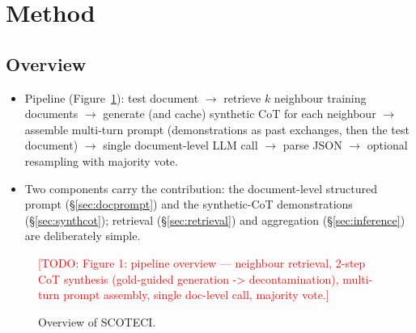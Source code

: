 \documentclass[11pt]{article}
\newcommand{\todo}[1]{\textcolor{red}{[TODO: #1]}}
\newcommand{\method}{SCOTECI}
\begin{document}
\section{Method}
\label{sec:method}

\subsection{Overview}
\begin{itemize}
  \item Pipeline (Figure~\ref{fig:overview}): test document $\to$ retrieve $k$
        neighbour training documents $\to$ generate (and cache) synthetic CoT
        for each neighbour $\to$ assemble multi-turn prompt (demonstrations as
        past exchanges, then the test document) $\to$ single document-level LLM
        call $\to$ parse JSON $\to$ optional resampling with majority vote.
  \item Two components carry the contribution: the document-level structured
        prompt (\S\ref{sec:docprompt}) and the synthetic-CoT demonstrations
        (\S\ref{sec:synthcot}); retrieval (\S\ref{sec:retrieval}) and
        aggregation (\S\ref{sec:inference}) are deliberately simple.
\end{itemize}

\begin{figure}[t]
  \centering
  \todo{Figure 1: pipeline overview --- neighbour retrieval, 2-step CoT
  synthesis (gold-guided generation -> decontamination), multi-turn prompt
  assembly, single doc-level call, majority vote.}
  \caption{Overview of \method{}.}
  \label{fig:overview}
\end{figure}
\end{document}
